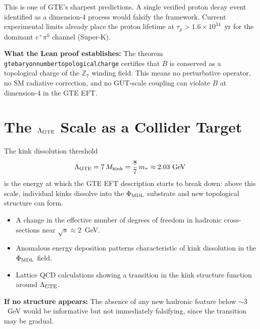 \documentclass[11pt,a4paper]{article}
\newcommand{\lean}[1]{%
  \penalty-100
  \begingroup\def\_{\textunderscore\allowbreak}\texttt{#1}\endgroup}
\begin{document}
This is one of GTE's sharpest predictions.  A single verified proton decay
event identified as a dimension-4 process would falsify the framework.  Current
experimental limits already place the proton lifetime at
$\tau_p > 1.6 \times 10^{34}$~yr for the dominant $e^+\pi^0$ channel (Super-K).

\textbf{What the Lean proof establishes:}
The theorem \lean{gte\_baryon\_number\_topological\_charge} certifies that $B$
is conserved as a topological charge of the $\mathbb{Z}_7$ winding field.  This
means no perturbative operator, no SM radiative correction, and no GUT-scale
coupling can violate $B$ at dimension-4 in the GTE EFT.

\section[The Lambda-GTE Scale as a Collider Target]{The $\Lambda_{\rm GTE}$ Scale as a Collider Target}
\label{sec:lambda_collider}

The kink dissolution threshold
\begin{equation}
  \Lambda_{\rm GTE} = 7\,M_{\rm kink} = \frac{8}{7}\,m_\tau \approx 2.03~\text{GeV}
\end{equation}
is the energy at which the GTE EFT description starts to break down: above
this scale, individual kinks dissolve into the $\Phi_{\rm MDL}$ substrate and
new topological structure can form.

\begin{tcolorbox}[colback=boxblue,colframe=blue!40!black,
  title=What to look for at $\Lambda_{\rm GTE}$]
\begin{itemize}[itemsep=3pt]
  \item A change in the effective number of degrees of freedom in hadronic
    cross-sections near $\sqrt{s} \approx 2$~GeV.
  \item Anomalous energy deposition patterns characteristic of kink dissolution
    in the $\Phi_{\rm MDL}$ field.
  \item Lattice QCD calculations showing a transition in the kink structure
    function around $\Lambda_{\rm GTE}$.
\end{itemize}
\textbf{If no structure appears:} The absence of any new hadronic feature below
$\sim 3$~GeV would be informative but not immediately falsifying, since the
transition may be gradual.
\end{tcolorbox}
\end{document}

